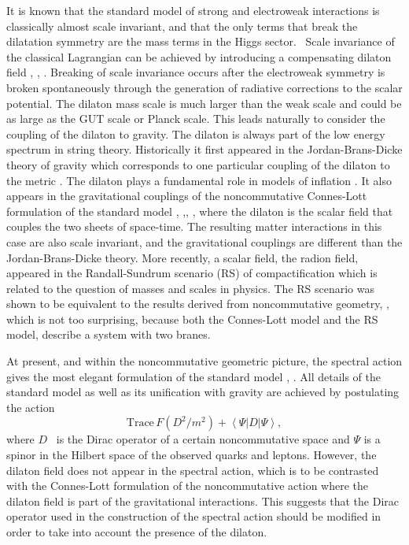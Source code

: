 \documentclass[12pt]{article}%
\begin{document}
\bigskip It is known that the standard model of strong and electroweak
interactions is classically almost scale invariant, and that the only terms
that break the dilatation symmetry are the mass terms in the Higgs sector.
\ Scale invariance of the classical Lagrangian can be achieved by introducing
a compensating dilaton field \cite{Coleman}, \cite{Bud}, \cite{Bubu}. Breaking
of scale invariance occurs after the electroweak symmetry is broken
spontaneously through the generation of radiative corrections to the scalar
potential. The dilaton mass scale is much larger than the weak scale and could
be as large as the GUT scale or Planck scale. This leads naturally to consider
the coupling of the dilaton to gravity. The dilaton is always part of the low
energy spectrum in string theory. Historically it first appeared in the
Jordan-Brans-Dicke theory of gravity which corresponds to one particular
coupling of the dilaton to the metric \cite{Bud}. The dilaton plays a
fundamental role in models of inflation \cite{Kolb}. It also appears in the
gravitational couplings of the noncommutative Connes-Lott formulation of the
standard model \cite{CL}, \cite{CFF},\cite{CFG}, \cite{CF}, where the dilaton
is the scalar field that couples the two sheets of space-time. The resulting
matter interactions in this case are also scale invariant, and the
gravitational couplings are different than the Jordan-Brans-Dicke theory. More
recently, a scalar field, the radion field, appeared in the Randall-Sundrum
scenario (RS) of compactification \cite{RS} which is related to the question
of masses and scales in physics. The RS scenario was shown to be equivalent to
the results derived from noncommutative geometry, \cite{Lizzi}, which is not
too surprising, because both the Connes-Lott model and the RS model, describe
a system with two branes.

At present, and within the noncommutative geometric picture, the spectral
action gives the most elegant formulation of the standard model \cite{ACAC},
\cite{Kastler}. All details of the standard model as well as its unification
with gravity are achieved by postulating the action
\[
\mathrm{Trace}\,F\left(  D^{2}/m^{2}\right)  +\left\langle \Psi\left\vert
D\right\vert \Psi\right\rangle ,
\]
where $D$ \ is the Dirac operator of a certain noncommutative space and $\Psi$
is a spinor in the Hilbert space of the observed quarks and leptons. However,
the dilaton field does not appear in the spectral action, which is to be
contrasted with the Connes-Lott formulation of the noncommutative action where
the dilaton field is part of the gravitational interactions. This suggests
that the Dirac operator used in the construction of the spectral action should
be modified in order to take into account the presence of the dilaton.
\end{document}
